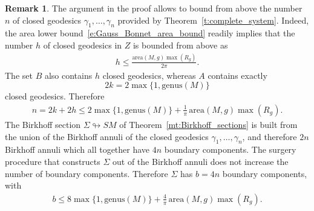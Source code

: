 \documentclass[JEP,XML,SOM,Unicode,NoFloatCountersInSection,published]{cedram}
\newcommand{\area}{\mathrm{area}}
\theoremstyle{plain}
\theoremstyle{definition}
\newtheorem{Remark}[Thm]{Remark}
\begin{document}
\begin{Remark}
\label{r:bound_boundary_components}
The argument in the proof allows to bound from above the number~$n$ of closed geodesics $\gamma_1,\dots,\gamma_n$ provided by Theorem~\ref{t:complete_system}. Indeed, the area lower bound~\eqref{e:Gauss_Bonnet_area_bound} readily implies that the number $h$ of closed geodesics in $Z$ is bounded from above as
\begin{align*}
h \leq \frac{\area(M,g)\max(R_g)}{2\pi}.
\end{align*}
The set $B$ also contains $h$ closed geodesics, whereas $A$ contains exactly \[
2k=2\max\big\{1,\mathrm{genus}(M)\big\}
\] closed geodesics. Therefore
\begin{align*}
n
=
2k+2h
\leq 2\max\big\{1,\mathrm{genus}(M)\big\}+\frac{1}{\pi}\,\area(M,g)\max(R_g).
\end{align*}
The Birkhoff section $\Sigma\looparrowright SM$ of Theorem~\ref{mt:Birkhoff_sections} is built from the union of the Birkhoff annuli of the closed geodesics $\gamma_1,\dots,\gamma_n$, and therefore $2n$ Birkhoff annuli which all together have $4n$ boundary components. The surgery procedure that constructs $\Sigma$ out of the Birkhoff annuli does not increase the number of boundary components. Therefore $\Sigma$ has $b=4n$ boundary components, with
\begin{align*}
b
\leq
8\max\big\{1,\mathrm{genus}(M)\big\}+\frac{4}{\pi}\,\area(M,g)\max(R_g).
\end{align*}
\end{Remark}

\backmatter


\end{document}
